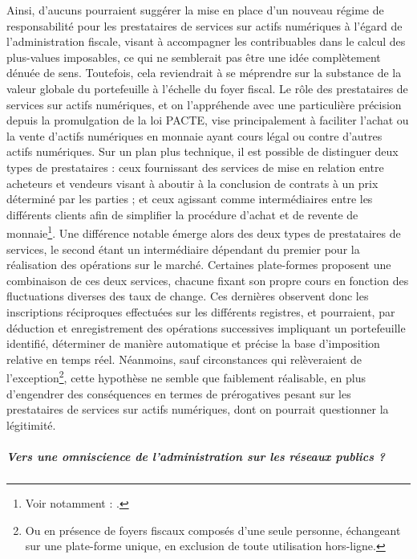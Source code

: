 {Ainsi, d'aucuns pourraient suggérer la mise en place d'un nouveau régime de responsabilité pour les prestataires de services sur actifs numériques à l'égard de l'administration fiscale, visant à accompagner les contribuables dans le calcul des plus-values imposables, ce qui ne semblerait pas être une idée complètement dénuée de sens. Toutefois, cela reviendrait à se méprendre sur la substance de la valeur globale du portefeuille à l'échelle du foyer fiscal. Le rôle des prestataires de services sur actifs numériques, et on l'appréhende avec une particulière précision depuis la promulgation de la loi PACTE, vise principalement à faciliter l'achat ou la vente d'actifs numériques en monnaie ayant cours légal ou contre d'autres actifs numériques. Sur un plan plus technique, il est possible de distinguer deux types de prestataires : ceux fournissant des services de mise en relation entre acheteurs et vendeurs visant à aboutir à la conclusion de contrats à un prix déterminé par les parties ; et ceux agissant comme intermédiaires entre les différents clients afin de simplifier la procédure d'achat et de revente de monnaie\footnote{Voir notamment : .}. Une différence notable émerge alors des deux types de prestataires de services, le second étant un intermédiaire dépendant du premier pour la réalisation des opérations sur le marché. Certaines plate-formes proposent une combinaison de ces deux services, chacune fixant son propre cours en fonction des fluctuations diverses des taux de change. Ces dernières observent donc les inscriptions réciproques effectuées sur les différents registres, et pourraient, par déduction et enregistrement des opérations successives impliquant un portefeuille identifié, déterminer de manière automatique et précise la base d'imposition relative en temps réel. Néanmoins, sauf circonstances qui relèveraient de l'exception\footnote{Ou en présence de foyers fiscaux composés d'une seule personne, échangeant sur une plate-forme unique, en exclusion de toute utilisation hors-ligne.}, cette hypothèse ne semble que faiblement réalisable, en plus d'engendrer des conséquences en termes de prérogatives pesant sur les prestataires de services sur actifs numériques, dont on pourrait questionner la légitimité.\par

\subparagraph{Vers une omniscience de l'administration sur les réseaux publics ?}

}
